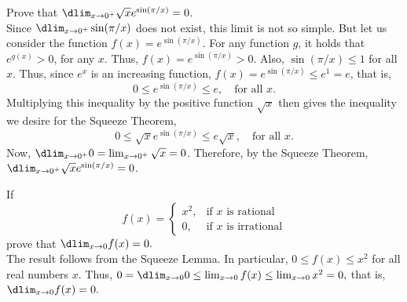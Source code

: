 \documentclass{book}
\begin{document}
\begin{Exam} Prove that $\dlim_{x\to 0^+} \sqrt{x} e^{\sin(\pi/x)} = 0$.\\

Since $\dlim_{x\to 0^+} \sin(\pi/x)$ does not exist, this limit is not so simple. But let us consider the function $f(x) = e^{\sin(\pi/x)}$. For any function $g$, it holds that $e^{g(x)} > 0$, for any $x$. Thus, $f(x) = e^{\sin(\pi/x)} > 0$. Also, $\sin(\pi / x) \le 1$ for all $x$. Thus, since $e^x$ is an increasing function, $f(x) = e^{\sin(\pi/x)} \le e^1 = e$, that is, 
\[0 \le  e^{\sin(\pi/x)} \le e,\quad\text{for all $x$.}\] Multiplying this inequality by the positive function $\sqrt{x}$ then gives the inequality we desire for the Squeeze Theorem, \[0 \le \sqrt{x}e^{\sin(\pi/x)} \le e\sqrt{x},\quad\text{for all $x$}.\] Now, $\dlim_{x\to 0^+} 0 = \lim_{x\to 0^+} \sqrt{x} = 0$. Therefore, by the Squeeze Theorem, $\dlim_{x\to 0^+} \sqrt{x}e^{\sin(\pi/x)} = 0$.
\end{Exam}\vs

\begin{Exam} If \[f(x) = \left\{\begin{array}{ll} x^2, & \mbox{if $x$ is rational}\\ 0, & \mbox{if $x$ is irrational}\end{array}\right.\] prove that $\dlim_{x\to 0} f(x) = 0.$\\

The result follows from the Squeeze Lemma. In particular, $0 \le f(x) \le x^2$ for all real numbers $x$. Thus, $0= \dlim_{x\to 0} 0 \le \lim_{x\to 0} f(x) \le \lim_{x\to 0} x^2 = 0,$ that is, $\dlim_{x\to 0} f(x) = 0.$
\end{Exam}\vs
\end{document}
